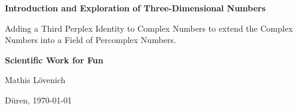 
\begin{titlepage}
	\thispagestyle{empty}
    \begin{center}
        \vspace*{1cm}
            
        \Huge
        \textbf{Introduction and Exploration of Three-Dimensional Numbers}
            
        \vspace{0.5cm}
        \LARGE
        Adding a Third Perplex Identity to Complex Numbers to
        extend the Complex Numbers into a Field of Percomplex Numbers.
            
        \vspace{1cm}
            
       \textbf{Scientific Work for Fun}
       
       \smaller
        Mathis Lövenich\\
        
        
        \vspace{2cm}
        \begin{minipage}[b]{7cm}
			\centering
			Düren, \today\\
		\end{minipage}
            
    \end{center}
    \restoregeometry
	\end{titlepage}